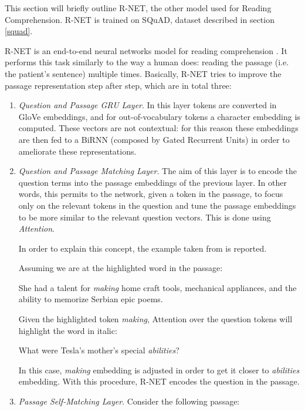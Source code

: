 This section will briefly outline R-NET, the other model used for Reading Comprehension. R-NET is trained on SQuAD, dataset described in section \ref{squad}.

R-NET is an end-to-end neural networks model for reading comprehension \cite{rnet}. It performs this task similarly to the way a human does: reading the passage (i.e. the patient's sentence) multiple times. Basically, R-NET tries to improve the passage representation step after step, which are in total three:
\begin{enumerate}
  \item \textit{Question and Passage GRU Layer}. In this layer tokens are converted in GloVe embeddings, and for out-of-vocabulary tokens a character embedding is computed. These vectors are not contextual: for this reason these embeddings are then fed to a BiRNN (composed by Gated Recurrent Units) in order to ameliorate these representations.
  \item \textit{Question and Passage Matching Layer}. The aim of this layer is to encode the question terms into the passage embeddings of the previous layer. In other words, this permits to the network, given a token in the passage, to focus only on the relevant tokens in the question and tune the passage embeddings to be more similar to the relevant question vectors. This is done using \textit{Attention}.
  
In order to explain this concept, the example taken from \cite{understandingrnet} is reported.

Assuming we are at the highlighted word in the passage:

\begin{displayquote}
She had a talent for \textit{making} home craft tools, mechanical appliances, and the ability to memorize Serbian epic poems.
\end{displayquote}

Given the highlighted token \textit{making}, Attention over the question tokens will highlight the word in italic:

\begin{displayquote}
What were Tesla's mother's special \textit{abilities}?
\end{displayquote}

In this case, \textit{making} embedding is adjusted in order to get it closer to \textit{abilities} embedding. With this procedure, R-NET encodes the question in the passage.

  \item \textit{Passage Self-Matching Layer}. Consider the following passage:
  

\end{enumerate}
